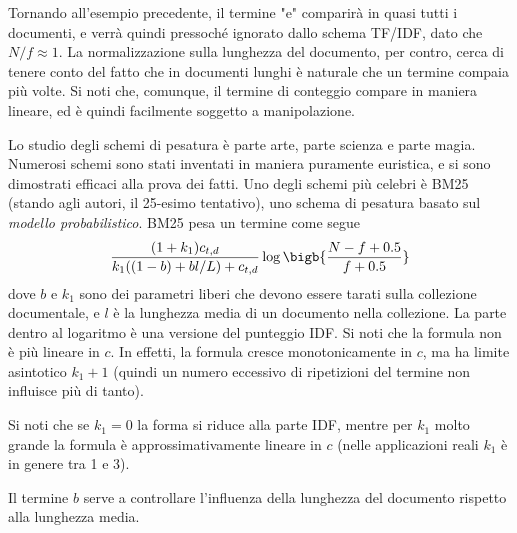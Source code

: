 Tornando all'esempio precedente, il termine "e" comparirà in quasi tutti i documenti, e verrà quindi pressoché ignorato dallo schema TF/IDF, dato che $N / f \approx 1$. La normalizzazione sulla lunghezza del documento, per contro, cerca di tenere conto del fatto che in documenti lunghi è naturale che un termine compaia più volte. Si noti che, comunque, il termine di conteggio compare in maniera lineare, ed è quindi facilmente soggetto a manipolazione.

Lo studio degli schemi di pesatura è parte arte, parte scienza e parte magia. Numerosi schemi sono stati inventati in maniera puramente euristica, e si sono dimostrati efficaci alla prova dei fatti. Uno degli schemi più celebri è BM25 (stando agli autori, il 25-esimo tentativo), uno schema di pesatura basato sul \textit{modello probabilistico}. BM25 pesa un termine come segue
\begin{equation*}
    \frac{(1 + k_1)c_{t, d}}{k_1((1 - b) + bl / L) + c_{t, d}}\log\bigb{\frac{N - f + 0.5}{f + 0.5}}
\end{equation*}
dove $b$ e $k_1$ sono dei parametri liberi che devono essere tarati sulla collezione documentale, e $l$ è la lunghezza media di un documento nella collezione. La parte dentro al logaritmo è una versione del punteggio IDF. Si noti che la formula non è più lineare in $c$. In effetti, la formula cresce monotonicamente in $c$, ma ha limite asintotico $k_1 + 1$ (quindi un numero eccessivo di ripetizioni del termine non influisce più di tanto).

Si noti che se $k_1 = 0$ la forma si riduce alla parte IDF, mentre per $k_1$ molto grande la formula è approssimativamente lineare in $c$ (nelle applicazioni reali $k_1$ è in genere tra 1 e 3).

Il termine $b$ serve a controllare l'influenza della lunghezza del documento rispetto alla lunghezza media.
